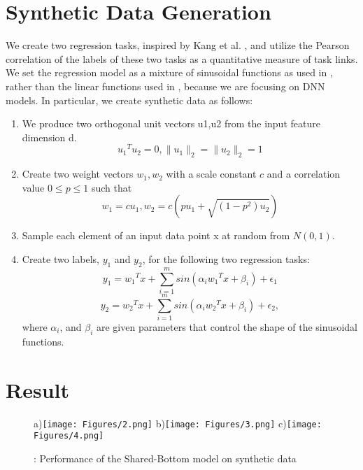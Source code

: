 \documentclass{article}
\begin{document}
\section{Synthetic Data Generation}
We create two regression tasks, inspired by Kang et al. \cite{kang2011learning}, and utilize the Pearson correlation of the labels of these two tasks as a quantitative measure of task links. We set the regression model as a mixture of sinusoidal functions as used in \cite{sun2017learning}, rather than the linear functions used in \cite{kang2011learning}, because we are focusing on DNN models. In particular, we create synthetic data as follows:
\begin{enumerate}
    \item We produce two orthogonal unit vectors u1,u2 from the input feature dimension d.
    \begin{equation}
        {u_1}^Tu_2 = 0, \lVert u_1\lVert_2 = \lVert u_2\lVert_2 = 1 
    \end{equation}
    \item Create two weight vectors $w_1,w_2$ with a scale constant $c$ and a correlation value $0\leq p \leq 1$ such that
    \begin{equation}
        w_1 = cu_1, w_2 = c\left(pu_1 +\sqrt{(1-p^2)u_2}\right)
    \end{equation}
    \item Sample each element of an input data point x at random from $N(0,1)$.
    \item Create two labels, $y_1$ and $y_2$, for the following two regression tasks:
        \begin{equation}
        y_1 = {w_1}^T x + \sum^m_{i=1}sin\left(\alpha_i {w_1}^T x +\beta_i\right) +\epsilon_1\nonumber
    \end{equation}
            \begin{equation}
        y_2 = {w_2}^T x + \sum^m_{i=1}sin\left(\alpha_i {w_2}^T x +\beta_i\right) +\epsilon_2,
    \end{equation}
where $\alpha_i$, and $\beta_i$ are given parameters that control the shape of the sinusoidal functions.
\end{enumerate}

\section{Result}
\begin{figure}
    \centering
\footnotesize{a)}{\texttt{[image: Figures/2.png]}}
\footnotesize{b)}{\texttt{[image: Figures/3.png]}}
\newline
\footnotesize{c)}{\texttt{[image: Figures/4.png]}}

\caption{: Performance of the Shared-Bottom model on synthetic data}
    \label{rslt}
\end{figure}



\end{document}

